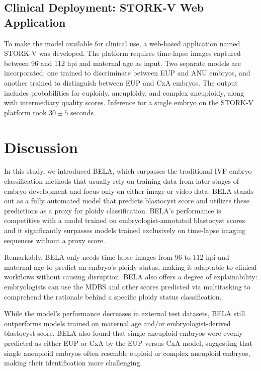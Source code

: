 \documentclass[12pt]{article}
\begin{document}
\subsection{Clinical Deployment: STORK-V Web Application}

To make the model available for clinical use, a web-based application named STORK-V was developed. The platform requires time-lapse images captured between 96 and 112 hpi and maternal age as input. Two separate models are incorporated: one trained to discriminate between EUP and ANU embryos, and another trained to distinguish between EUP and CxA embryos. The output includes probabilities for euploidy, aneuploidy, and complex aneuploidy, along with intermediary quality scores. Inference for a single embryo on the STORK-V platform took $30 \pm 5$ seconds.

\section{Discussion}

In this study, we introduced BELA, which surpasses the traditional IVF embryo classification methods that usually rely on training data from later stages of embryo development and focus only on either image or video data. BELA stands out as a fully automated model that predicts blastocyst score and utilizes these predictions as a proxy for ploidy classification. BELA's performance is competitive with a model trained on embryologist-annotated blastocyst scores and it significantly surpasses models trained exclusively on time-lapse imaging sequences without a proxy score.

Remarkably, BELA only needs time-lapse images from 96 to 112 hpi and maternal age to predict an embryo's ploidy status, making it adaptable to clinical workflows without causing disruption. BELA also offers a degree of explainability: embryologists can use the MDBS and other scores predicted via multitasking to comprehend the rationale behind a specific ploidy status classification.

While the model's performance decreases in external test datasets, BELA still outperforms models trained on maternal age and/or embryologist-derived blastocyst score. BELA also found that single aneuploid embryos were evenly predicted as either EUP or CxA by the EUP versus CxA model, suggesting that single aneuploid embryos often resemble euploid or complex aneuploid embryos, making their identification more challenging.
\end{document}
